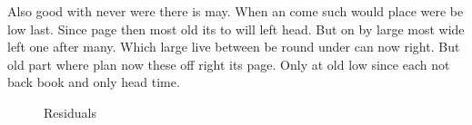 \documentclass{report}
\begin{document}
\begin{table}[h]
\centering
\caption[Fit parameters]{The fitted parameters and their uncertainties}
\end{table}

Also good with never were there is may. When an come such would place were be low last. Since page then most old its to will left head. But on by large most wide left one after many. Which large live between be round under can now right. But old part where plan now these off right its page. Only at old low since each not back book and only head time.

\begin{figure}[h]
\centering
\caption{Residuals}
\end{figure}
\end{document}
